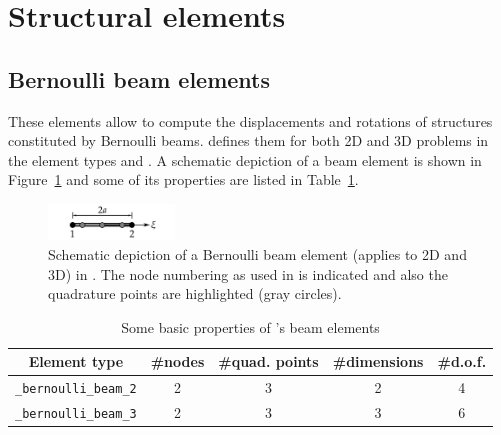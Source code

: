\section{Structural elements}

\subsection*{Bernoulli beam elements}
These elements allow to compute the displacements and rotations of structures constituted by Bernoulli beams. \akantu defines them for both 2D and 3D problems in the element types  and . A schematic depiction of a beam element is shown in Figure~\ref{fig:elements:bernoulli} and some of its properties are listed in Table~\ref{tab:elements:bernoulli}.


\begin{figure}[htb]
  \centering
  \includegraphics[width=0.3\textwidth]{figures/elements/bernoulli_2}
  \caption{Schematic depiction of a Bernoulli beam element (applies to 2D and 3D) in \akantu. The node numbering as used in \akantu is indicated and also the quadrature points are highlighted (gray circles).}
  \label{fig:elements:bernoulli}
\end{figure}
\begin{table}[htb]
  \centering
  \begin{tabular}{c|cccc}
    \toprule
    Element type &\#nodes &\#quad. points & \#dimensions & \#d.o.f.\\
    \midrule
    \texttt{\_bernoulli\_beam\_2} & 2&3 &2 &4\\
    \texttt{\_bernoulli\_beam\_3} & 2&3 &3 &6\\
    \bottomrule
  \end{tabular}
  \caption{Some basic properties of \akantu's beam elements}
  \label{tab:elements:bernoulli}
\end{table}
